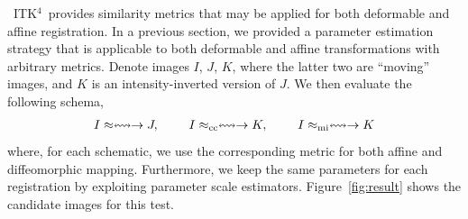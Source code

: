 \documentclass{llncs}
\newcommand{\tk}{~ITK$^{\text{4}}$~}
\begin{document}
\tk provides similarity metrics that may be applied for both
deformable and affine registration.  In a previous section, we
provided a parameter estimation strategy that is applicable to both
deformable and affine transformations with arbitrary metrics.  Denote
images $I$, $J$, $K$, where the latter two are ``moving'' images, and
$K$ is an intensity-inverted version of $J$.
We then evaluate the following schema,
\begin{eqnarray}
I \approx \leftrightsquigarrow  \rightarrow J,~~~~~~~
I \approx_\text{cc} \leftrightsquigarrow  \rightarrow  K,~~~~~~~  
I \approx_\text{mi} \leftrightsquigarrow  \rightarrow  K   \notag 
\end{eqnarray}
where, for each schematic, we use the corresponding metric for both
affine and diffeomorphic mapping.  Furthermore, we keep the same
parameters for each registration by exploiting parameter scale
estimators.  Figure~\ref{fig:result} shows the candidate images for
this test. 
\end{document}
